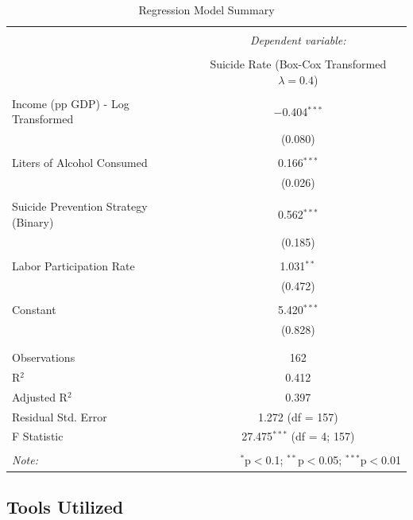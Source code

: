 \documentclass[]{article}
\begin{document}
\begin{table}[H] \centering 
  \caption {Regression Model Summary} 
  \label{tab:title} 
\begin{tabular}{@{\extracolsep{5pt}}lc} 
\\[-1.8ex]\hline 
\hline \\[-1.8ex] 
 & \multicolumn{1}{c}{\textit{Dependent variable:}} \\ 
\cline{2-2} 
\\[-1.8ex] & Suicide Rate (Box-Cox Transformed $\lambda = 0.4$) \\ 
\hline \\[-1.8ex] 
 Income (pp GDP) - Log Transformed & $-$0.404$^{***}$ \\ 
  & (0.080) \\ 
  & \\ 
Liters of Alcohol Consumed & 0.166$^{***}$ \\ 
  & (0.026) \\ 
  & \\ 
Suicide Prevention Strategy (Binary) & 0.562$^{***}$ \\ 
  & (0.185) \\ 
  & \\ 
Labor Participation Rate & 1.031$^{**}$ \\ 
  & (0.472) \\ 
  & \\ 
 Constant & 5.420$^{***}$ \\ 
  & (0.828) \\ 
  & \\ 
\hline \\[-1.8ex] 
Observations & 162 \\ 
R$^{2}$ & 0.412 \\ 
Adjusted R$^{2}$ & 0.397 \\ 
Residual Std. Error & 1.272 (df = 157) \\ 
F Statistic & 27.475$^{***}$ (df = 4; 157) \\ 
\hline 
\hline \\[-1.8ex] 
\textit{Note:}  & \multicolumn{1}{r}{$^{*}$p$<$0.1; $^{**}$p$<$0.05; $^{***}$p$<$0.01} \\ 
\end{tabular} 
\end{table}

\subsection{Tools Utilized}\label{tools-utilized}
\end{document}
